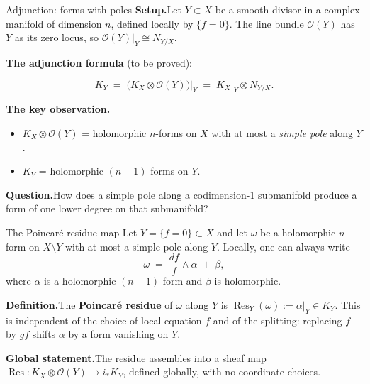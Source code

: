 \documentclass[aspectratio=169,12pt]{beamer}
\newenvironment{mathbox}{%
  \begin{tcolorbox}[mathbox]}{%
  \end{tcolorbox}}
\begin{document}

\begin{frame}{Adjunction: forms with poles}
  \textbf{Setup.}\enspace Let $Y \subset X$ be a smooth divisor in a complex
  manifold of dimension $n$, defined locally by $\{f = 0\}$.
  The line bundle $\mathcal{O}(Y)$ has $Y$ as its zero locus,
  so $\mathcal{O}(Y)|_Y \cong N_{Y/X}$.

  \medskip

  \textbf{The adjunction formula} (to be proved):
  \begin{mathbox}
  \[
    K_Y \;=\; \bigl(K_X \otimes \mathcal{O}(Y)\bigr)\big|_Y
         \;=\; K_X\big|_Y \otimes N_{Y/X}.
  \]
  \end{mathbox}

  \textbf{The key observation.}
  \begin{itemize}
    \item $K_X \otimes \mathcal{O}(Y)$ = holomorphic $n$-forms on $X$ with at most
          a \emph{simple pole} along $Y$.
    \item $K_Y$ = holomorphic $(n-1)$-forms on $Y$.
  \end{itemize}

  \medskip

  \textbf{Question.}\enspace How does a simple pole along a codimension-1
  submanifold produce a form of one lower degree on that submanifold?
\end{frame}

\begin{frame}{The Poincaré residue map}
  Let $Y = \{f = 0\} \subset X$ and let $\omega$ be a holomorphic $n$-form
  on $X \setminus Y$ with at most a simple pole along $Y$.
  Locally, one can always write
  \[
    \omega \;=\; \frac{df}{f} \wedge \alpha \;+\; \beta,
  \]
  where $\alpha$ is a holomorphic $(n-1)$-form and $\beta$ is holomorphic.

  \medskip

  \textbf{Definition.}\enspace The \textbf{Poincaré residue} of $\omega$ along $Y$ is
  $\operatorname{Res}_Y(\omega) := \alpha|_Y \in K_Y$.
  This is independent of the choice of local equation $f$ and of the splitting:
  replacing $f$ by $gf$ shifts $\alpha$ by a form vanishing on $Y$.

  \medskip

  \textbf{Global statement.}\enspace The residue assembles into a sheaf map
  $\operatorname{Res} : K_X \otimes \mathcal{O}(Y) \to i_* K_Y$,
  defined globally, with no coordinate choices.
\end{frame}
\end{document}
